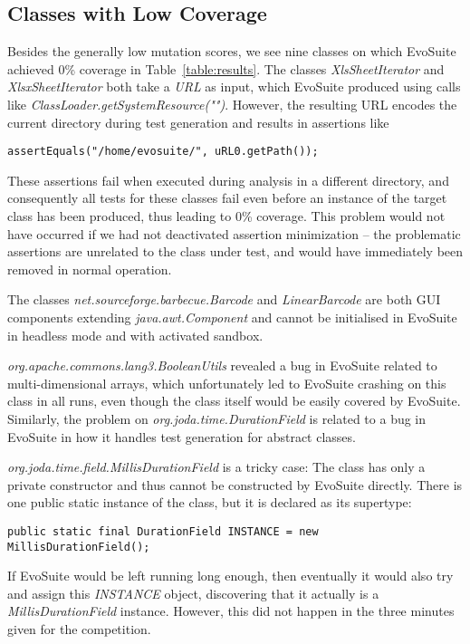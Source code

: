 \documentclass[10pt,conference,compsocconf]{IEEEtran}
\newcommand{\EVOSUITE}{{\sc EvoSuite}\xspace}
\begin{document}
\subsection{Classes with Low Coverage}

Besides the generally low mutation scores, we see nine classes on
which \EVOSUITE achieved 0\% coverage in
Table~\ref{table:results}. The classes {\it XlsSheetIterator} and {\it
  XlsxSheetIterator} both take a {\it URL} as input, which \EVOSUITE
produced using calls like {\it
  ClassLoader.getSystemResource("")}. However, the resulting URL
encodes the current directory during test generation and results in
assertions like
\begin{lstlisting}
assertEquals("/home/evosuite/", uRL0.getPath());
\end{lstlisting}
These assertions fail when executed during analysis in a different
directory, and consequently all tests for these classes fail even
before an instance of the target class has been produced, thus leading
to 0\% coverage. This problem would not have occurred if we had not
deactivated assertion minimization -- the problematic assertions are
unrelated to the class under test, and would have immediately been removed in normal operation.

The classes {\it net.sourceforge.barbecue.Barcode} and {\it
  LinearBarcode} are both GUI components extending {\it
  java.awt.Component} and cannot be initialised in \EVOSUITE in
headless mode and with activated sandbox.

{\it org.apache.commons.lang3.BooleanUtils} revealed a bug in
\EVOSUITE related to multi-dimensional arrays, which unfortunately led
to \EVOSUITE crashing on this class in all runs, even though the class
itself would be easily covered by \EVOSUITE. Similarly, the problem on
{\it org.joda.time.DurationField} is related to a bug in \EVOSUITE in
how it handles test generation for abstract classes.

{\it org.joda.time.field.MillisDurationField} is a tricky case: The
class has only a private constructor and thus cannot be constructed by
\EVOSUITE directly. There is one public static instance of the class,
but it is declared as its supertype:
\begin{lstlisting}
public static final DurationField INSTANCE = new MillisDurationField();
\end{lstlisting}
If \EVOSUITE would be left running long enough, then eventually it
would also try and assign this {\it INSTANCE} object, discovering that
it actually is a {\it MillisDurationField} instance. However, this did
not happen in the three minutes given for the competition.
\end{document}
